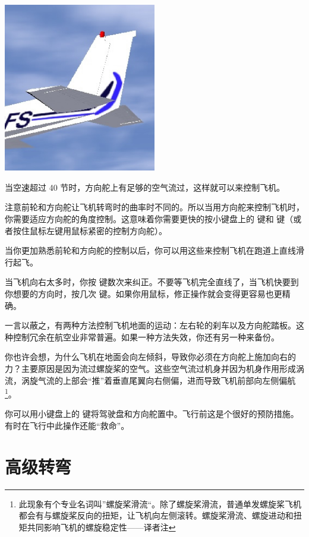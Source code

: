 \begin{center}
\includegraphics[width=0.5\textwidth]{img/tut_26}
\end{center}

当空速超过 40 节时，方向舵上有足够的空气流过，这样就可以来控制飞机。

注意前轮和方向舵让飞机转弯时的曲率时不同的。所以当用方向舵来控制飞机时，你需要适应方向舵的角度控制。这意味着你需要更快的按小键盘上的  键和  键（或者按住鼠标左键用鼠标紧密的控制方向舵）。

当你更加熟悉前轮和方向舵的控制以后，你可以用这些来控制飞机在跑道上直线滑行起飞。

当飞机向右太多时，你按  键数次来纠正。不要等飞机完全直线了，当飞机快要到你想要的方向时，按几次  键。如果你用鼠标，修正操作就会变得更容易也更精确。

一言以蔽之，有两种方法控制飞机地面的运动：左右轮的刹车以及方向舵踏板。这种控制冗余在航空业非常普遍。如果一种方法失效，你还有另一种来备份。

你也许会想，为什么飞机在地面会向左倾斜，导致你必须在方向舵上施加向右的力？主要原因是因为流过螺旋桨的空气。这些空气流过机身并因为机身作用形成涡流，涡旋气流的上部会“推”着垂直尾翼向右侧偏，进而导致飞机前部向左侧偏航\footnote{此现象有个专业名词叫”螺旋桨滑流“。除了螺旋桨滑流，普通单发螺旋桨飞机都会有与螺旋桨反向的扭矩，让飞机向左侧滚转。螺旋桨滑流、螺旋进动和扭矩共同影响飞机的螺旋稳定性——译者注}。

你可以用小键盘上的  键将驾驶盘和方向舵置中。飞行前这是个很好的预防措施。有时在飞行中此操作还能“救命”。

\section{高级转弯}
\label{sec:Turning}

